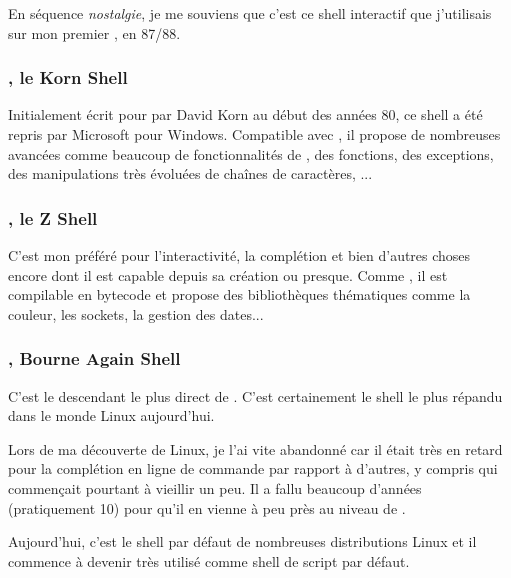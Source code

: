 En séquence \emph{nostalgie}, je me souviens que c'est ce shell interactif que j'utilisais sur mon premier \unix, en 87/88.

\subsubsection{\ksh, le Korn Shell}
Initialement écrit pour \unix par David Korn au début des années 80, ce shell a été repris par Microsoft pour Windows. Compatible avec \sh, il propose de nombreuses avancées comme beaucoup de fonctionnalités de \tcsh,  des fonctions, des exceptions, des manipulations très évoluées de chaînes de caractères, ...

\subsubsection{\zsh, le Z Shell}
C'est mon préféré pour l'interactivité, la complétion et bien d'autres choses encore dont il est capable depuis sa création ou presque. Comme \ksh, il est compilable en bytecode et propose des bibliothèques thématiques comme la couleur, les sockets, la gestion des dates...

\subsubsection{\bash, Bourne Again Shell}
C'est le descendant le plus direct de \sh. C'est certainement le shell le plus répandu dans le monde Linux aujourd'hui. 

Lors de ma découverte de Linux, je l'ai vite abandonné car il était très en retard pour la complétion en ligne de commande par rapport à d'autres, y compris \tcsh qui commençait pourtant à vieillir un peu. Il a fallu beaucoup d'années (pratiquement 10) pour qu'il en vienne à peu près au niveau de \zsh.

Aujourd'hui, c'est le shell par défaut de nombreuses distributions Linux et il commence à devenir très utilisé comme shell de script par défaut. 

